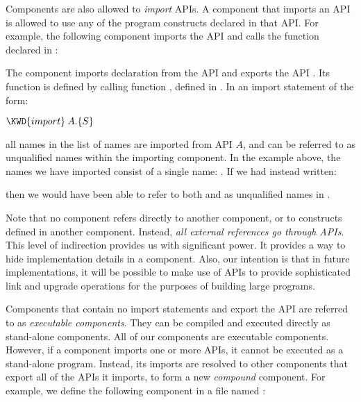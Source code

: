 Components are also allowed to \emph{import} APIs. A component that
imports an API is allowed to use any of the program constructs
declared in that API. For example, the following component imports the API
 and calls the function  declared in :


The component  imports declaration  from the API 
and exports the API
. Its  function is defined by calling function
, defined in .
In an import statement of the form:
\begin{Fortress}
\(\KWD{import}\:A.\{S\}\)
\end{Fortress}
all names in the list of names  are imported from API $A$, and can be
referred to as unqualified names within the importing component. In
the example above, the names we have imported consist of a
single name: . If we had instead written:

then we would have been able to refer to both  and 
as unqualified names in .

Note that no component refers directly to another component,
or to constructs defined in another component.
Instead, \emph{all external references go through APIs}.
This level of indirection provides us with significant power.
It provides a way to hide implementation details in a component.
Also, our intention is that in future implementations,
it will be possible to make use of APIs to provide sophisticated
link and upgrade operations for the purposes of building
large programs.

Components that contain no import statements and export the API
 are referred to as \emph{executable components}. They
can be compiled and executed directly as stand-alone components. All
of our  components are executable components.
However,
if a component imports one or more APIs, it cannot be executed as a
stand-alone program. Instead, its imports are resolved to
other components that export all of the APIs it imports,
to form a new \emph{compound} component. For example, we define
the following component in a file named :
%

